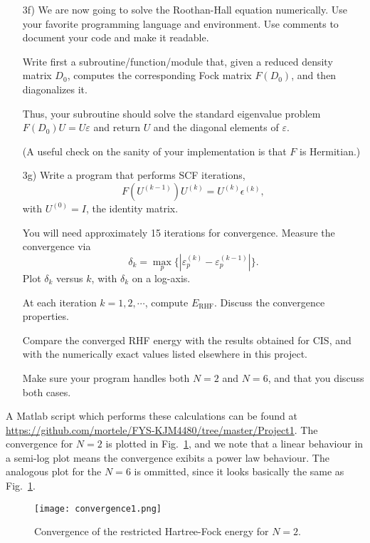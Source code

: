 \documentclass[a4paper]{article}
\newcommand{\fig}[1]{Fig.\ \ref{fig:#1}}
\begin{document}
\begin{exframe}
\begin{itemize}
  \item[3f)] We are now going to solve the Roothan-Hall equation numerically. Use your favorite programming language and environment. Use comments to document your code and make it readable.

  Write first a subroutine/function/module that, given a reduced
  density matrix $D_0$, computes the corresponding Fock matrix
  $F(D_0)$, and then diagonalizes it.

  Thus, your subroutine should solve the standard eigenvalue problem
  $F(D_0)U = U\varepsilon$ and return $U$ and the diagonal elements of
  $\varepsilon$.

  (A useful check on the sanity of your implementation is that $F$ is
  Hermitian.)
\end{itemize}
\end{exframe}
\begin{exframe}
\begin{itemize}
  \item[3g)] Write a program that performs SCF iterations,
  \begin{equation}
    F(U^{(k-1)}) U^{(k)} = U^{(k)}\epsilon^{(k)},
  \end{equation}
  with $U^{(0)}=I$, the identity matrix.

  You will need approximately 15 iterations for convergence. Measure
  the convergence via
  \begin{equation}
    \delta_k = \max_p\{|\varepsilon^{(k)}_p - \varepsilon^{(k-1)}_p|\}.
  \end{equation}
  Plot $\delta_k$ versus $k$, with $\delta_k$ on a log-axis.
  
  At each iteration $k=1,2,\cdots$, compute $E_\text{RHF}$. Discuss the
  convergence properties.

  Compare the converged RHF energy with the results obtained for CIS,
  and with the numerically exact values listed elsewhere in this project.

  Make sure your program handles both $N=2$ and $N=6$, and that you
  discuss both cases.
\end{itemize}
\end{exframe}
A {\sc Matlab} script which performs these calculations can be found at \url{https://github.com/mortele/FYS-KJM4480/tree/master/Project1}. The convergence for $N=2$ is plotted in \fig{1}, and we note that a linear behaviour in a semi-log plot means the convergence exibits a power law behaviour. The analogous plot for the $N=6$ is ommitted, since it looks basically the same as \fig{1}.
\begin{figure}[h]
\centering
\texttt{[image: convergence1.png]}
\caption{Convergence of the restricted Hartree-Fock energy for $N=2$. \label{fig:1}}
\end{figure}
\end{document}
